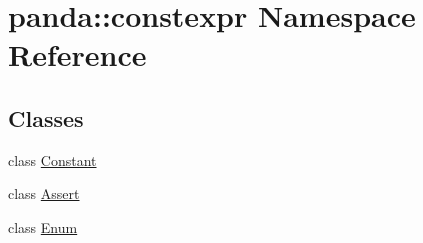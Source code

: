 \hypertarget{namespacepanda_1_1constexpr}{
\section{panda::constexpr Namespace Reference}
\label{namespacepanda_1_1constexpr}
}
\subsection*{Classes}
\begin{DoxyCompactItemize}
\item 
class \hyperlink{classpanda_1_1constexpr_1_1Constant}{Constant}
\item 
class \hyperlink{classpanda_1_1constexpr_1_1Assert}{Assert}
\item 
class \hyperlink{classpanda_1_1constexpr_1_1Enum}{Enum}
\end{DoxyCompactItemize}
